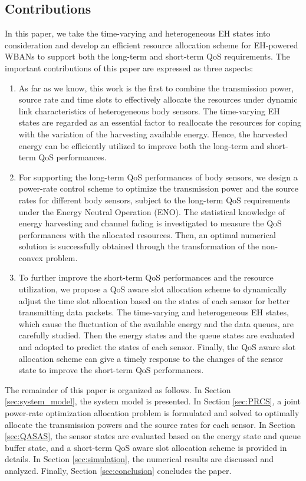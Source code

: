 \documentclass[journal,10pt]{IEEEtran}
\begin{document}
\subsection{Contributions}
In this paper, we take the time-varying and heterogeneous EH states into consideration and develop an efficient resource allocation scheme for EH-powered WBANs to support both the long-term and short-term QoS requirements.
The important contributions of this paper are expressed as three aspects:
 \begin{enumerate}
	 \item As far as we know, this work is the first to combine the transmission power, source rate and time slots to effectively allocate the resources under dynamic link characteristics of heterogeneous body sensors. The time-varying EH states are regarded as an essential factor to reallocate the resources for coping with the variation of the harvesting available energy.
Hence, the harvested energy can be efficiently utilized to improve both the long-term and short-term QoS performances.
	 \item For supporting the long-term QoS performances of body sensors, we design a power-rate control scheme to optimize the transmission power and the source rates for different body sensors, subject to the long-term QoS requirements under the Energy Neutral Operation (ENO).
The statistical knowledge of energy harvesting and channel fading is investigated to measure the QoS performances with the allocated resources. Then, an optimal numerical solution is successfully obtained through the transformation of the non-convex problem. 
	\item To further improve the short-term QoS performances and the resource utilization, we propose a QoS aware slot allocation scheme to dynamically adjust the time slot allocation based on the states of each sensor for better transmitting data packets.
The time-varying and heterogeneous EH states, which cause the fluctuation of the available energy and the data queues, are carefully studied. Then the energy states and the queue states are evaluated and adopted to predict the states of each sensor. 
Finally, the QoS aware slot allocation scheme can give a timely response to the changes of the sensor state to improve the short-term QoS performances.

 \end{enumerate}
The remainder of this paper is organized as follows. 
In Section \ref{sec:system_model}, the system model is presented. In Section \ref{sec:PRCS}, a joint power-rate optimization allocation problem is formulated and solved to optimally allocate the transmission powers and the source rates for each sensor. 
In Section \ref{sec:QASAS}, the sensor states are evaluated based on the energy state and queue buffer state, and a short-term QoS aware slot allocation scheme is provided in details.
In Section \ref{sec:simulation}, the numerical results are discussed and analyzed. Finally, Section \ref{sec:conclusion} concludes the paper.
\end{document}
